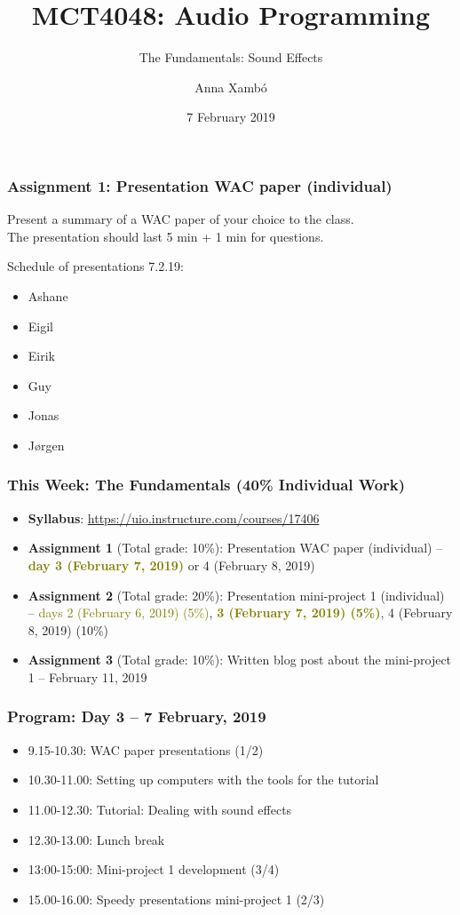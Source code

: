 \documentclass[screen, aspectratio=43]{beamer}
\title[AP-intro]{MCT4048: Audio Programming}
\subtitle{The Fundamentals: Sound Effects}
\author[A. Xamb{\'o}]{Anna Xamb{\'o}}
\institute[NTNU]{Department of Music, NTNU}
\date{7 February 2019}
\begin{document}
\begin{frame}
  \titlepage
\end{frame}


%
\begin{frame}
\frametitle{Assignment 1: Presentation WAC paper (individual)}

Present a summary of a WAC paper of your choice to the class.\\ 
The presentation should last 5 min + 1 min for questions.

\vspace{10 mm}

Schedule of presentations 7.2.19:
\begin{itemize}
\item Ashane
\item Eigil
\item Eirik
\item Guy
\item Jonas
\item Jørgen
\end{itemize}
\end{frame}
%
\begin{frame}
\frametitle{This Week: The Fundamentals (40\% Individual Work)}
\begin{itemize}
\item \textbf{Syllabus}: \url{https://uio.instructure.com/courses/17406}
\item \textbf{Assignment 1} (Total grade: 10\%): Presentation WAC paper (individual) -- \textbf{\textcolor{olive}{day 3 (February 7, 2019)}} or 4 (February 8, 2019)
\item \textbf{Assignment 2} (Total grade: 20\%): Presentation mini-project 1 (individual) -- \textcolor{olive}{days 2 (February 6, 2019) (5\%)}, \textbf{\textcolor{olive}{3 (February 7, 2019) (5\%)}}, 4 (February 8, 2019) (10\%)
\item \textbf{Assignment 3} (Total grade: 10\%): Written blog post about the mini-project 1 -- February 11, 2019
\end{itemize}
\end{frame}
%
\begin{frame}
\frametitle{Program: Day 3 -- 7 February, 2019}
\begin{itemize}
\item 9.15-10.30: WAC paper presentations (1/2)
\item 10.30-11.00: Setting up computers with the tools for the tutorial
\item 11.00-12.30: Tutorial: Dealing with sound effects
\item 12.30-13.00: Lunch break
\item 13:00-15:00: Mini-project 1 development (3/4)
\item 15.00-16.00: Speedy presentations mini-project 1 (2/3)
\end{itemize}
\end{frame}
\end{document}
